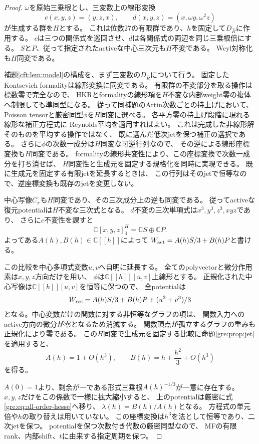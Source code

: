 \begin{proof}
$\omega$を原始三乗根とし、三変数上の線形変換
\[
 c(x,y,z)=(y,z,x),\qquad
 d(x,y,z)=(x,\omega y,\omega^2z)
\]
が生成する群を$H$とする。
これは位数27の有限群であり、$h$を固定して$D_{\widehat R}$に作用する。
$c$は三つの関係式を巡回させ、$d$は各関係式の両辺を同じ三乗根倍にする。
$S$と$P$、従って指定されたactiveな中心三次元も$H$不変である。
Weyl対称化も$H$同変である。

補題\ref{cft:lem:model}の構成を、まず三変数の$D_{\widehat R}$について行う。
固定したKontsevich formalityは線形変換に同変である。
有限群の不変部分を取る操作は標数零で完全なので、
HKRとformalityの線形項を$H$不変な内部weight零の複体へ制限しても準同型になる。
従って同補題のArtin次数ごとの持上げにおいて、
Poisson tensorと厳密同型$\phi$を$H$同変に選べる。
各平方零の持上げ段階に現れる線形な補正方程式に
Reynolds平均を適用すればよい。
これは完成した非線形解そのものを平均する操作ではなく、
既に選んだ低次jetを保つ補正の選択である。
さらに$\phi$の次数一成分は$H$同変な可逆行列なので、
その逆による線形座標変換も$H$同変である。
formalityの線形共変性により、この座標変換で次数一成分を打ち消せば、
$H$同変性と生成元を固定する規格化を同時に実現できる。
既に生成元を固定する有限jetを延長するときは、
この行列はそのjetで恒等なので、逆座標変換も既存のjetを変更しない。

中心写像$C_\pi$も$H$同変であり、その三次成分上の逆も同変である。
従ってactiveな復元potentialは$H$不変な三次式となる。
$d$不変の三次単項式は$x^3,y^3,z^3,xyz$であり、
さらに$c$不変性を課すと
\[
 \mathbb C[x,y,z]_3^H=\mathbb C S\oplus\mathbb C P.
\]
よってある$A(h),B(h)\in\mathbb C[[h]]$によって
$W_{\rm act}=A(h)S/3+B(h)P$と書ける。

この比較を中心多項式変数$u,v$へ自明に延長する。
全てのpolyvectorと微分作用素は$x,y,z$方向だけを用い、
$\phi$は$\mathbb C[[h]][u,v]$上線形とする。
正規化された中心写像は$\mathbb C[[h]][u,v]$を恒等に保つので、
全potentialは
\[
 W_{\rm rec}=A(h)S/3+B(h)P+(u^3+v^3)/3
\]
となる。中心変数だけの関数に対する非恒等なグラフの項は、
関数入力へのactive方向の微分が零となるため消滅する。
関数頂点が孤立するグラフの重みも正規化により零である。
この$H$同変で生成元を固定する比較に命題\ref{gre:prop:jet}を適用すると、
\[
 A(h)=1+O(h^3),\qquad B(h)=h+\frac{h^2}{3}+O(h^3)
\]
を得る。

$A(0)=1$より、剰余が一である形式三乗根$A(h)^{-1/3}$が一意に存在する。
$x,y,z$だけをこの係数で一様に拡大縮小すると、
上のpotentialは厳密に式\eqref{gre:eq:all-order-hesse}へ移り、
$\lambda(h)=B(h)/A(h)$となる。
方程式の単元倍や$h$の取り替えは用いていない。
この座標変換は$h^3$を法として恒等であり、二次jetを保つ。
potentialを保つ次数付き代数の厳密同型なので、
MFの有限rank、内部shift、$t$に由来する指定周期を保つ。
\end{proof}

